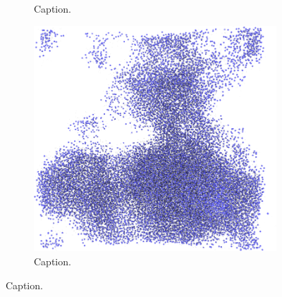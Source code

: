 \begin{figure}[htpb]
\begin{subfigure}[b]{\myfigwidth}
        \caption{Caption.}%
    \end{subfigure}%
    \hfill%
    \begin{subfigure}[b]{\myfigwidth}%
        \centering%
        \includegraphics[width=\textwidth]{images/systems/trimmed-rough_fracture01_abel_17}%
        \caption{Caption.}%
    \end{subfigure}%
    \caption{%
        Caption. %
        \label{fig:rough_fracture01}%
    }%
\end{figure}%

